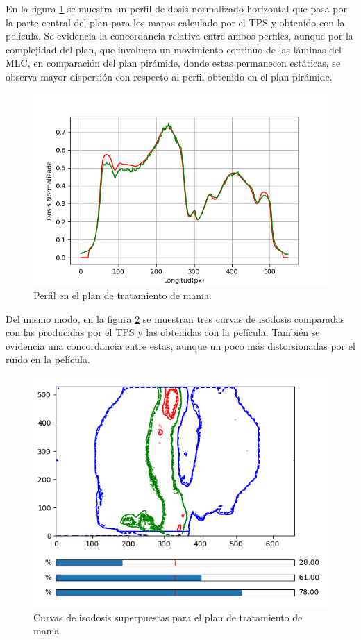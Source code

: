En la figura \ref{fig:mamaPerfil} se muestra un perfil de dosis normalizado horizontal que pasa por la parte central del plan para los mapas calculado por el TPS y obtenido con la película. Se evidencia la concordancia relativa entre ambos perfiles, aunque por la complejidad del plan, que involucra un movimiento continuo de las láminas del MLC, en comparación del plan pirámide, donde estas permanecen estáticas, se observa mayor dispersión con respecto al perfil obtenido en el plan pirámide.\\

\begin{figure}[H]
	\centering
	\includegraphics[width=0.7\linewidth]{images/perfilDosisMama.png}
	\caption{Perfil en el plan de tratamiento de mama. }
	\label{fig:mamaPerfil}
\end{figure}

Del mismo modo, en la figura \ref{fig:mamaIsodosis} se muestran tres curvas de isodosis comparadas con las producidas por el TPS y las obtenidas con la película. También se evidencia una concordancia entre estas, aunque un poco más distorsionadas por el ruido en la película.

\begin{figure}[H]
	\centering
	\includegraphics[width=0.7\linewidth]{images/curvasIsodosisMama.png}
	\caption{Curvas de isodosis superpuestas para el plan de tratamiento de mama }
	\label{fig:mamaIsodosis}
\end{figure}

